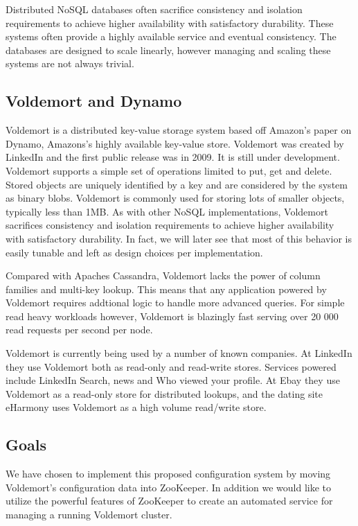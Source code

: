 Distributed NoSQL databases often sacrifice consistency and isolation requirements to achieve higher availability with satisfactory durability. These systems often provide a highly available service and eventual consistency.
The databases are designed to scale linearly, however managing and scaling these systems are not always trivial\cite{tellybug}. 


\subsection{Voldemort and Dynamo}
Voldemort is a distributed key-value storage system based off Amazon's paper on Dynamo, Amazons's highly available key-value store. Voldemort was created by LinkedIn and the first public release was in 2009. It is still under development. Voldemort supports a simple set of operations limited to put, get and delete. Stored objects are uniquely identified by a key and are considered by the system as binary blobs. Voldemort is commonly used for storing lots of smaller objects, typically less than 1MB.  As with other NoSQL implementations, Voldemort sacrifices consistency and isolation requirements to achieve higher availability with satisfactory durability. In fact, we will later see that most of this behavior is easily tunable and left as design choices per implementation.

Compared with Apaches Cassandra, Voldemort lacks the power of column families and multi-key lookup. This means that any application powered by Voldemort requires addtional logic to handle more advanced queries. For simple read heavy workloads however, Voldemort is blazingly fast serving over 20 000 read requests per second per node. 

Voldemort is currently being used by a number of known companies. At LinkedIn they use Voldemort both as read-only and read-write stores. Services powered include LinkedIn Search, news and Who viewed your profile. At Ebay they use Voldemort as a read-only store for distributed lookups, and the dating site eHarmony uses Voldemort as a high volume read/write store.



\subsection{Goals}
We have chosen to implement this proposed configuration system by moving Voldemort's configuration data into ZooKeeper. In addition we would like to utilize the powerful features of ZooKeeper to create an automated service for managing a running Voldemort cluster. 

